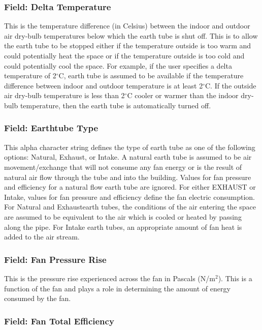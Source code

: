 \subsubsection{Field: Delta Temperature}\label{field-delta-temperature-4}

This is the temperature difference (in Celsius) between the indoor and outdoor air dry-bulb temperatures below which the earth tube is shut off. This is to allow the earth tube to be stopped either if the temperature outside is too warm and could potentially heat the space or if the temperature outside is too cold and could potentially cool the space. For example, if the user specifies a delta temperature of 2$^\circ$C, earth tube is assumed to be available if the temperature difference between indoor and outdoor temperature is at least 2$^\circ$C. If the outside air dry-bulb temperature is less than 2$^\circ$C cooler or warmer than the indoor dry-bulb temperature, then the earth tube is automatically turned off.

\subsubsection{Field: Earthtube Type}\label{field-earthtube-type}

This alpha character string defines the type of earth tube as one of the following options: Natural, Exhaust, or Intake. A natural earth tube is assumed to be air movement/exchange that will not consume any fan energy or is the result of natural air flow through the tube and into the building. Values for fan pressure and efficiency for a natural flow earth tube are ignored. For either EXHAUST or Intake, values for fan pressure and efficiency define the fan electric consumption. For Natural and Exhaustearth tubes, the conditions of the air entering the space are assumed to be equivalent to the air which is cooled or heated by passing along the pipe. For Intake earth tubes, an appropriate amount of fan heat is added to the air stream.

\subsubsection{Field: Fan Pressure Rise}\label{field-fan-pressure-rise-1}

This is the pressure rise experienced across the fan in Pascals (N/m\(^{2}\)). This is a function of the fan and plays a role in determining the amount of energy consumed by the fan.

\subsubsection{Field: Fan Total Efficiency}\label{field-fan-total-efficiency-1}

